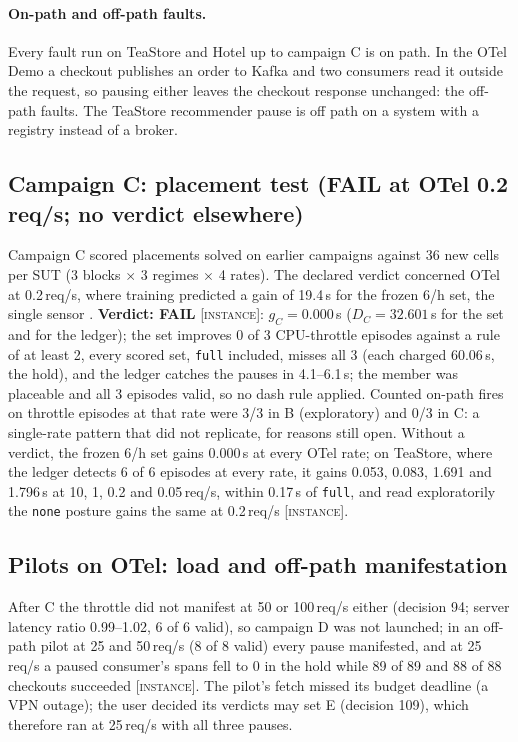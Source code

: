 \documentclass{ceurart}
\newcommand{\scope}[1]{\textsc{[#1]}}
\begin{document}
\paragraph{On-path and off-path faults.} Every fault run on TeaStore and Hotel up to campaign C is on path. In the OTel
Demo a checkout publishes an order to Kafka and two consumers read it outside the request, so pausing either leaves the
checkout response unchanged: the off-path faults. The TeaStore recommender pause is off path on a system with a registry
instead of a broker.

\subsection{Campaign C: placement test (FAIL at OTel 0.2\,req/s; no verdict elsewhere)}\label{sec:c}
Campaign C scored placements solved on earlier campaigns against 36 new cells per SUT (3 blocks $\times$ 3 regimes
$\times$ 4 rates). The declared verdict concerned OTel at 0.2\,req/s, where training predicted a gain of 19.4\,s for the
frozen 6/h set, the single sensor . \textbf{Verdict: FAIL} \scope{instance}: $g_C = 0.000$\,s
($D_C = 32.601$\,s for the set and for the ledger); the set improves 0 of 3 CPU-throttle episodes against a rule of at
least 2, every scored set, \texttt{full} included, misses all 3 (each charged 60.06\,s, the hold), and the ledger catches
the pauses in 4.1--6.1\,s; the member was placeable and all 3 episodes valid, so no dash rule applied. Counted on-path
fires on throttle episodes at that rate were 3/3 in B (exploratory) and 0/3 in C: a single-rate pattern that did not
replicate, for reasons still open. Without a verdict, the frozen 6/h set gains 0.000\,s at every OTel rate; on TeaStore,
where the ledger detects 6 of 6 episodes at every rate, it gains 0.053, 0.083, 1.691 and 1.796\,s at 10, 1, 0.2 and
0.05\,req/s, within 0.17\,s of \texttt{full}, and read exploratorily the \texttt{none} posture gains the same at
0.2\,req/s \scope{instance}.

\subsection{Pilots on OTel: load and off-path manifestation}\label{sec:pilots}
After C the throttle did not manifest at 50 or 100\,req/s either (decision 94; server latency ratio 0.99--1.02, 6 of 6
valid), so campaign D was not launched; in an off-path pilot at 25 and 50\,req/s (8 of 8 valid) every pause manifested,
and at 25\,req/s a paused consumer's spans fell to 0 in the hold while 89 of 89 and 88 of 88 checkouts succeeded
\scope{instance}. The pilot's fetch missed its budget deadline (a VPN outage); the user decided its verdicts may set E
(decision 109), which therefore ran at 25\,req/s with all three pauses.
\end{document}

